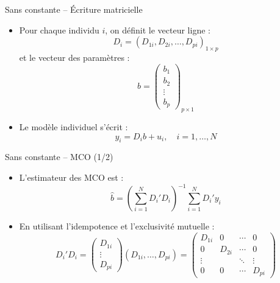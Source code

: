 \documentclass[11pt,aspectratio=169]{beamer}
\begin{document}
\begin{frame}{Sans constante -- Écriture matricielle}

\begin{itemize}

\item Pour chaque individu $i$, on définit le vecteur ligne :
  \[
  D_i = (D_{1i}, D_{2i}, \ldots, D_{pi})_{1 \times p}
  \]
  et le vecteur des paramètres :
  \[
  b = \begin{pmatrix} b_1 \\ b_2 \\ \vdots \\ b_p \end{pmatrix}_{p \times 1}
  \]\newline

\item Le modèle individuel s'écrit :
  \[
  y_i = D_i b + u_i, \quad i = 1, \ldots, N
  \]

\end{itemize}

\end{frame}

\begin{frame}{Sans constante -- MCO (1/2)}

\begin{itemize}

\item L'estimateur des MCO est :
  \[
  \hat{b} = \left( \sum_{i=1}^{N} D_i' D_i \right)^{-1} \sum_{i=1}^{N} D_i' y_i
  \]\newline

\item En utilisant l'idempotence et l'exclusivité mutuelle :
  \[
  D_i' D_i = \begin{pmatrix} D_{1i} \\ \vdots \\ D_{pi} \end{pmatrix} (D_{1i}, \ldots, D_{pi}) = \begin{pmatrix}
      D_{1i} & 0 & \cdots & 0 \\
      0 & D_{2i} & \cdots & 0 \\
      \vdots & & \ddots & \vdots \\
      0 & 0 & \cdots & D_{pi}
  \end{pmatrix}
  \]

\end{itemize}

\end{frame}
\end{document}
